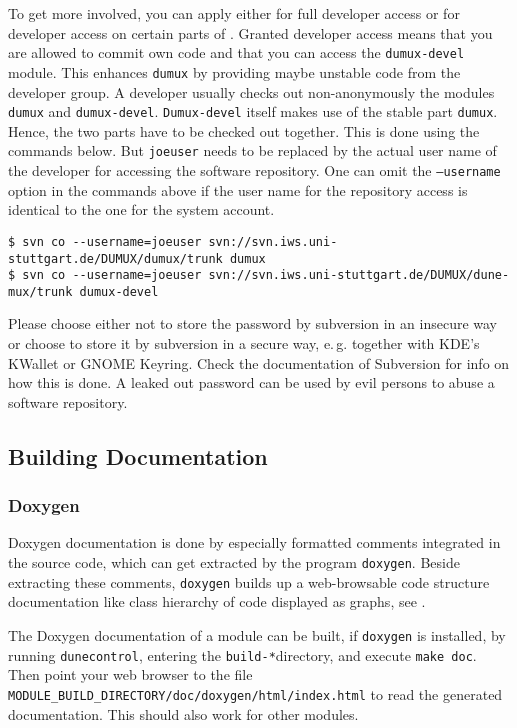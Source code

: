 To get more involved, you can apply either for full developer
access or for developer access on certain parts of \Dumux. Granted developer access means that
you are allowed to commit own code and that you can access the \texttt{dumux-devel} module.
This enhances \texttt{dumux} by providing maybe unstable code from the developer group.
A developer usually checks out non-anonymously the modules \texttt{dumux} and \texttt{dumux-devel}.
\texttt{Dumux-devel} itself makes use of the stable part \texttt{dumux}. Hence, the two parts have to be checked out together.
This is done using the commands below. But \texttt{joeuser} needs to be replaced by
the actual user name of the developer for accessing the software repository.
One can omit the \texttt{--username} option in the commands above if the user name for the repository access is
identical to the one for the system account.

\begin{lstlisting}[style=Bash]
$ svn co --username=joeuser svn://svn.iws.uni-stuttgart.de/DUMUX/dumux/trunk dumux
$ svn co --username=joeuser svn://svn.iws.uni-stuttgart.de/DUMUX/dune-mux/trunk dumux-devel
\end{lstlisting}

Please choose either not to store the password by subversion in an insecure way or
choose to store it by subversion in a secure way, e.\,g. together with KDE's KWallet or GNOME Keyring.
Check the documentation of Subversion for info on how this is done.
A leaked out password can be used by evil persons to abuse a software repository.

\subsection{Building Documentation}
\subsubsection{Doxygen}
\label{sec:build-doxy-doc}
Doxygen documentation is done by especially formatted comments integrated in the source code,
which can get extracted by the program \texttt{doxygen}. Beside extracting these comments,
\texttt{doxygen} builds up a web-browsable code structure documentation
like class hierarchy of code displayed as graphs, see \cite{DOXYGEN-HP}.

The Doxygen documentation of a module can be built, if \texttt{doxygen} is installed,
by running \texttt{dunecontrol}, entering the \texttt{build-*}directory, and execute
\texttt{make doc}. Then point your web browser to the file
\texttt{MODULE\_BUILD\_DIRECTORY/doc/doxygen/html/index.html} to read the generated documentation.
This should also work for other \Dune modules.

